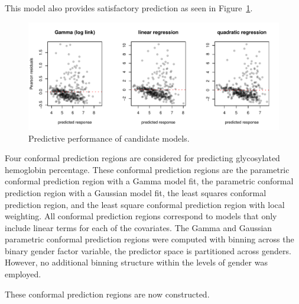 \documentclass[11pt]{article}\usepackage[]{graphicx}\usepackage[]{color}
\makeatletter
\def\maxwidth{ %
  \ifdim\Gin@nat@width>\linewidth
    \linewidth
  \else
    \Gin@nat@width
  \fi
}
\newenvironment{knitrout}{}{} %
\makeatother
\begin{document}
This model also provides satisfactory prediction as seen in 
Figure~\ref{diabetes:diagnostics}.


\begin{figure}
\begin{center}
\begin{knitrout}
\color{fgcolor}
\includegraphics[width=\maxwidth]{figure/unnamed-chunk-10-1} 

\end{knitrout}
\end{center}
\caption{Predictive performance of candidate models.}
\label{diabetes:diagnostics}
\end{figure}


Four conformal prediction regions are considered for predicting glycosylated 
hemoglobin percentage.  These conformal prediction regions are the parametric 
conformal prediction region with a Gamma model fit, the parametric conformal 
prediction region with a Gaussian model fit, the least squares conformal 
prediction region, and the least square conformal prediction region with 
local weighting.  
All conformal prediction regions correspond to models that only include 
linear terms for each of the covariates.  
The Gamma and Gaussian parametric conformal prediction regions were 
computed with binning across the binary gender factor variable, the predictor 
space is partitioned across genders. 
However, no additional binning structure within the levels of gender was 
employed.  

These conformal prediction regions are now constructed.
\end{document}
